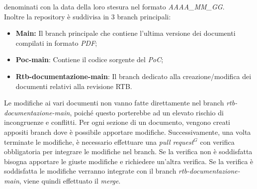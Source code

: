     denominati con la data della loro stesura nel formato \emph{AAAA\_MM\_GG}. \\
    Inoltre la repository è suddivisa in 3 branch principali:
    \begin{itemize}
        \item \textbf{Main:} Il branch principale che contiene l'ultima versione dei documenti compilati in formato \emph{PDF};
        \item \textbf{Poc-main}: Contiene il codice sorgente del \emph{PoC};
        \item \textbf{Rtb-documentazione-main}: Il branch dedicato alla creazione/modifica dei documenti relativi alla revisione RTB.
    \end{itemize}
    Le modifiche ai vari documenti non vanno fatte direttamente nel branch \emph{rtb-documentazione-main},
    poiché questo porterebbe ad un elevato rischio di incongruenze e conflitti. Per ogni sezione di un documento, vengono
    creati appositi branch dove è possibile apportare modifiche. Successivamente, una volta terminate le modifiche, è necessario
    effettuare una \emph{pull request}$^{G}$ con verifica obbligatoria per integrare le modifiche nel branch. Se la verifica non è
    soddisfatta bisogna apportare le giuste modifiche e richiedere un'altra verifica. Se la verifica è
    soddisfatta le modifiche verranno integrate con il branch \emph{rtb-documentazione-main}, viene quindi effettuato il \emph{merge}. 